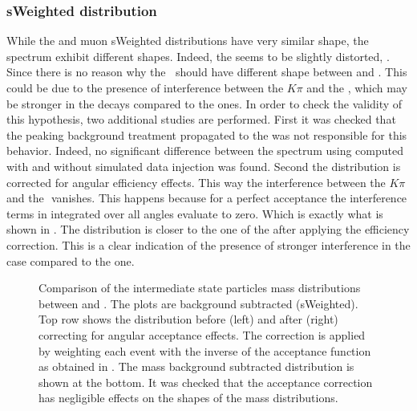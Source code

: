 \subsubsection{sWeighted \mkpi distribution}
While the \Bs and \Bd muon sWeighted distributions have very similar shape, the \mkpi spectrum exhibit different shapes. 
Indeed, the \Bs \mkpi \sPlot seems to be slightly distorted, . Since there is no reason why the \Kst$~$\pwave 
should have different shape between \BsJpsiKst and \BdJpsiKst. This could be due to the presence of interference between
the $K\pi$ \swave and the \Kstarz, which may be stronger in the \Bs decays compared to the \Bd ones. In order 
to check the validity of this hypothesis, two additional studies are performed. First it was checked that the peaking
background treatment propagated to the \sWeights was not responsible for this behavior. Indeed, no significant difference 
between the \Bs \mkpi spectrum using \sWeights computed with and without simulated data injection was found. Second the \mkpi 
distribution is corrected for angular efficiency effects. This way the interference between the $K\pi$ \swave and the 
\Kstarz $ $ \pwave vanishes. This happens because for a perfect acceptance the interference terms in  integrated over all angles
evaluate to zero. Which is exactly what is shown in . The \Bs \mkpi distribution is closer to the one of the \Bd after applying
the efficiency correction. This is a clear indication of the presence of stronger interference in the \Bs case compared to the \Bd one.

\begin{figure}[h]
  \centering
  \begin{subfigure}{0.5\textwidth}
    \scalebox{0.65}{}
    \caption{}
    \label{mkpiPlot_raw}
  \end{subfigure}%
  \hfill%
  \begin{subfigure}{0.5\textwidth}
    \scalebox{0.65}{}
    \caption{}
    \label{mkpiPlot_eff}
  \end{subfigure}
  \begin{subfigure}{0.5\textwidth}
    \scalebox{0.65}{}
    \caption{}
    \label{jpsiPlot}
  \end{subfigure}
\caption{Comparison of the intermediate state particles mass distributions between \Bs and \Bd.
         The plots are background subtracted (sWeighted). Top row shows the \mkpi distribution before (left)
         and after (right) correcting for angular acceptance effects. The correction is applied by weighting
          each event with the inverse of the acceptance function as obtained in .
         The \Jpsi mass background subtracted distribution is shown at the bottom. It was checked that the 
         acceptance correction has negligible effects on the shapes of the \Jpsi mass distributions. }

\end{figure}

